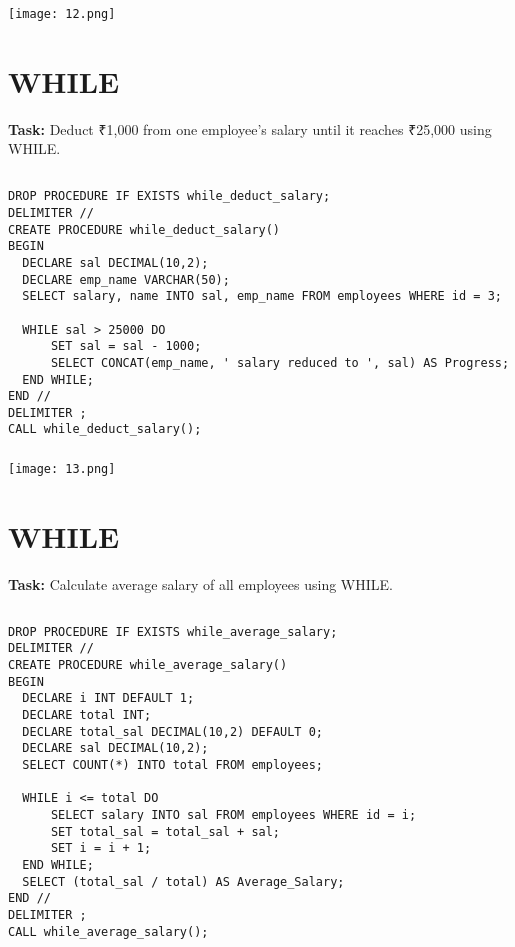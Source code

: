 \documentclass[12pt,a4paper]{article}
\begin{document}
\subsubsection{}
\begin{center}
    \texttt{[image: 12.png]}
\end{center}


\section{WHILE}
\textbf{Task:} Deduct ₹1,000 from one employee’s salary until it reaches ₹25,000 using
WHILE.

\subsection{}
\begin{lstlisting}
DROP PROCEDURE IF EXISTS while_deduct_salary;
DELIMITER //
CREATE PROCEDURE while_deduct_salary()
BEGIN
  DECLARE sal DECIMAL(10,2);
  DECLARE emp_name VARCHAR(50);
  SELECT salary, name INTO sal, emp_name FROM employees WHERE id = 3;

  WHILE sal > 25000 DO
      SET sal = sal - 1000;
      SELECT CONCAT(emp_name, ' salary reduced to ', sal) AS Progress;
  END WHILE;
END //
DELIMITER ;
CALL while_deduct_salary();

\end{lstlisting}

\subsubsection{}
\begin{center}
    \texttt{[image: 13.png]}
\end{center}


\section{WHILE}
\textbf{Task:} Calculate average salary of all employees using WHILE.

\subsection{}
\begin{lstlisting}
DROP PROCEDURE IF EXISTS while_average_salary;
DELIMITER //
CREATE PROCEDURE while_average_salary()
BEGIN
  DECLARE i INT DEFAULT 1;
  DECLARE total INT;
  DECLARE total_sal DECIMAL(10,2) DEFAULT 0;
  DECLARE sal DECIMAL(10,2);
  SELECT COUNT(*) INTO total FROM employees;

  WHILE i <= total DO
      SELECT salary INTO sal FROM employees WHERE id = i;
      SET total_sal = total_sal + sal;
      SET i = i + 1;
  END WHILE;
  SELECT (total_sal / total) AS Average_Salary;
END //
DELIMITER ;
CALL while_average_salary();

\end{lstlisting}
\end{document}
